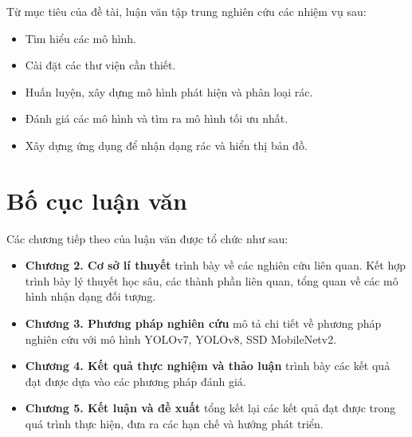 \documentclass[../the.tex]{subfiles}
\begin{document}
{\fontsize{13}{12} \selectfont

Từ mục tiêu của đề tài, luận văn tập trung nghiên cứu các nhiệm vụ sau:

\begin{itemize}
  \item Tìm hiểu các mô hình.
  \item Cài đặt các thư viện cần thiết.
  \item Huấn luyện, xây dựng mô hình phát hiện và phân loại rác.
  \item Đánh giá các mô hình và tìm ra mô hình tối ưu nhất.
  \item Xây dựng ứng dụng để nhận dạng rác và hiển thị bản đồ.
\end{itemize}

}

\section{Bố cục luận văn}
\label{bo_cuc}

{\fontsize{13}{12} \selectfont

Các chương tiếp theo của luận văn được tổ chức như sau:

\begin{itemize}
  \item \textbf{Chương 2. Cơ sở lí thuyết} trình bày về các nghiên cứu liên quan. Kết hợp trình bày lý thuyết học sâu, các thành phần liên quan, tổng quan về các mô hình nhận dạng đối tượng.
  \item \textbf{Chương 3. Phương pháp nghiên cứu} mô tả chi tiết về phương pháp nghiên cứu với mô hình YOLOv7, YOLOv8, SSD MobileNetv2.
  \item \textbf{Chương 4. Kết quả thực nghiệm và thảo luận} trình bày các kết quả đạt được dựa vào các phương pháp đánh giá.
  \item \textbf{Chương 5. Kết luận và đề xuất} tổng kết lại các kết quả đạt được trong quá trình thực hiện, đưa ra các hạn chế và hướng phát triển.
\end{itemize}

}


\end{document}
